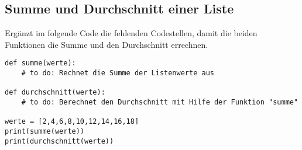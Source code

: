 \subsection{Summe und Durchschnitt einer Liste }
Ergänzt im folgende Code die fehlenden Codestellen, damit die beiden Funktionen die Summe und den Durchschnitt errechnen.
\begin{lstlisting}
def summe(werte):
    # to do: Rechnet die Summe der Listenwerte aus
	
def durchschnitt(werte):
    # to do: Berechnet den Durchschnitt mit Hilfe der Funktion "summe"

werte = [2,4,6,8,10,12,14,16,18]
print(summe(werte))
print(durchschnitt(werte))
\end{lstlisting}
